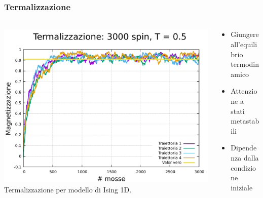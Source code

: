 \begin{frame}
    \frametitle{Termalizzazione}
    \framesubtitle{}

    \begin{columns}

        \begin{column}{0.6\textwidth}

            \centering
            \includegraphics[width=\textwidth]{Immagini/metodiNumerici/term_3000_0.5.pdf}
            \newline
            {\scriptsize Termalizzazione per modello di Ising 1D.}

        \end{column}


        \begin{column}{0.4\textwidth}

            \begin{itemize}[itemsep=0.5em, label=$\diamond$]
                \item Giungere all'equilibrio termodinamico
                \item Attenzione a stati metastabili
                \item Dipendenza dalla condizione iniziale
            \end{itemize}
            
        \end{column}
      \end{columns}
  
\end{frame}
